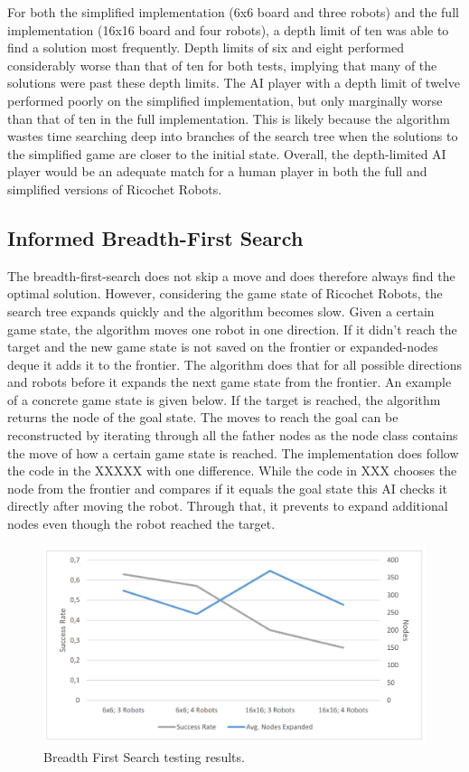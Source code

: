 \documentclass[a4paper,10pt]{article}
\begin{document}
  For both the simplified implementation (6x6 board and three robots) and the full implementation (16x16 board and four robots), a depth limit of ten was able to
  find a solution most frequently.  Depth limits of six and eight performed considerably worse than that of ten for both tests, implying that many of the solutions were
  past these depth limits.  The AI player with a depth limit of twelve performed poorly on the simplified implementation, but only marginally worse than that of ten in
  the full implementation.  This is likely because the algorithm wastes time searching deep into branches of the search tree when the solutions to the simplified game
  are closer to the initial state.  Overall, the depth-limited AI player would be an adequate match for a human player in both the full and simplified versions of
  Ricochet Robots.\\


  \subsection{Informed Breadth-First Search}
  The breadth-first-search does not skip a move and does therefore always find the optimal solution. However, considering the game state of Ricochet Robots, the search tree expands quickly and the algorithm becomes slow. Given a certain game state, the algorithm moves one robot in one direction. If it didn't reach the target and the new game state is not saved on the frontier or expanded-nodes deque it adds it to the frontier. The algorithm does that for all possible directions and robots before it expands the next game state from the frontier. An example of a concrete game state is given below. If the target is reached, the algorithm returns the node of the goal state. The moves to reach the goal can be reconstructed by iterating through all the father nodes as the node class contains the move of how a certain game state is reached. The implementation does follow the code in the XXXXX with one difference. While the code in XXX chooses the node from the frontier and compares if it equals the goal state this AI checks it directly after moving the robot. Through that, it prevents to expand additional nodes even though the robot reached the target.

  \begin{figure}
  	\centering
  	\label{fig_bfs:test}
  	\includegraphics[scale=0.47]{figures/Bfs_test_results.PNG}
  	\caption{Breadth First Search testing results.}
  \end{figure}
\end{document}
